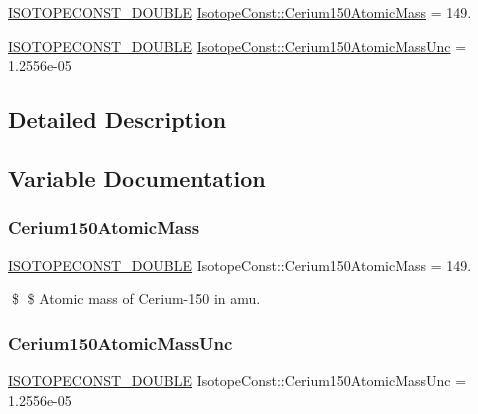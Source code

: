 \begin{DoxyCompactItemize}
\item 
\mbox{\hyperlink{group___isotope_const-_macros_ga8f45a7272ce02c0b4c65c44636ed719a}{I\+S\+O\+T\+O\+P\+E\+C\+O\+N\+S\+T\+\_\+\+D\+O\+U\+B\+LE}} \mbox{\hyperlink{group___isotope_const-_cerium-_ce150_ga664425862a44f035a92a0f4c66cd58b3}{Isotope\+Const\+::\+Cerium150\+Atomic\+Mass}} = 149.
\item 
\mbox{\hyperlink{group___isotope_const-_macros_ga8f45a7272ce02c0b4c65c44636ed719a}{I\+S\+O\+T\+O\+P\+E\+C\+O\+N\+S\+T\+\_\+\+D\+O\+U\+B\+LE}} \mbox{\hyperlink{group___isotope_const-_cerium-_ce150_ga317619c3f6c0322be57062da19b52a9b}{Isotope\+Const\+::\+Cerium150\+Atomic\+Mass\+Unc}} = 1.\+2556e-\/05
\end{DoxyCompactItemize}


\subsection{Detailed Description}


\subsection{Variable Documentation}
\mbox{\label{group___isotope_const-_cerium-_ce150_ga664425862a44f035a92a0f4c66cd58b3}} 
\subsubsection{\texorpdfstring{Cerium150\+Atomic\+Mass}{Cerium150AtomicMass}}
{\footnotesize\ttfamily \mbox{\hyperlink{group___isotope_const-_macros_ga8f45a7272ce02c0b4c65c44636ed719a}{I\+S\+O\+T\+O\+P\+E\+C\+O\+N\+S\+T\+\_\+\+D\+O\+U\+B\+LE}} Isotope\+Const\+::\+Cerium150\+Atomic\+Mass = 149.}

\$ \$ Atomic mass of Cerium-\/150 in amu. \mbox{\label{group___isotope_const-_cerium-_ce150_ga317619c3f6c0322be57062da19b52a9b}} 
\subsubsection{\texorpdfstring{Cerium150\+Atomic\+Mass\+Unc}{Cerium150AtomicMassUnc}}
{\footnotesize\ttfamily \mbox{\hyperlink{group___isotope_const-_macros_ga8f45a7272ce02c0b4c65c44636ed719a}{I\+S\+O\+T\+O\+P\+E\+C\+O\+N\+S\+T\+\_\+\+D\+O\+U\+B\+LE}} Isotope\+Const\+::\+Cerium150\+Atomic\+Mass\+Unc = 1.\+2556e-\/05}

